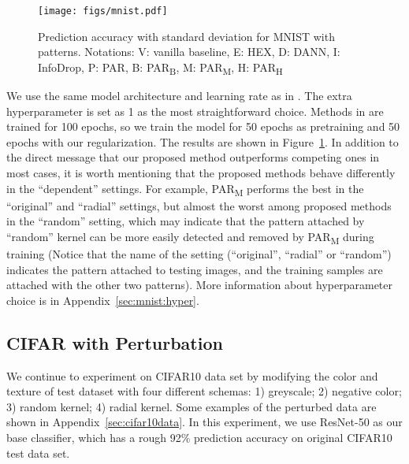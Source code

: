 \documentclass{article}
\begin{document}
\begin{figure}
    \centering
    \texttt{[image: figs/mnist.pdf]}
    \caption{Prediction accuracy with standard deviation for MNIST with patterns. Notations: V: vanilla baseline, E: HEX, D: DANN, I: InfoDrop, P: PAR, B: PAR\textsubscript{B}, M: PAR\textsubscript{M}, H: PAR\textsubscript{H}}
    \label{fig:mnist}
\end{figure}

We use the same model architecture and learning rate as in \citet{wang2018learning}. 
The extra hyperparameter  is set as 1 as the most straightforward choice. Methods in \citet{wang2018learning} are trained for 100 epochs, 
so we train the model for 50 epochs as pretraining 
and 50 epochs with our regularization. 
The results are shown in Figure~\ref{fig:mnist}. 
In addition to the direct message 
that our proposed method outperforms competing ones in most cases, 
it is worth mentioning that the proposed methods 
behave differently in the ``dependent'' settings. 
For example,
PAR\textsubscript{M} performs the best in the ``original'' and ``radial'' settings, 
but almost the worst among proposed methods in the ``random'' setting,
which may indicate that the pattern attached by ``random'' kernel 
can be more easily detected and removed by PAR\textsubscript{M} 
during training (Notice that the name of the setting (``original'', ``radial'' or ``random'') 
indicates the pattern attached to testing images, 
and the training samples are attached with the other two patterns).
More information about hyperparameter choice is in Appendix~\ref{sec:mnist:hyper}. 

\subsection{CIFAR with Perturbation}

We continue to experiment on CIFAR10 data set by modifying the color and texture of test dataset with four different schemas:
1) greyscale; 2) negative color; 3) random kernel; 4) radial kernel. Some examples of the perturbed data are shown in Appendix~\ref{sec:cifar10data}. In this experiment, we use ResNet-50 as our base classifier, which has a rough 92\% prediction accuracy on original CIFAR10 test data set. 
\end{document}
